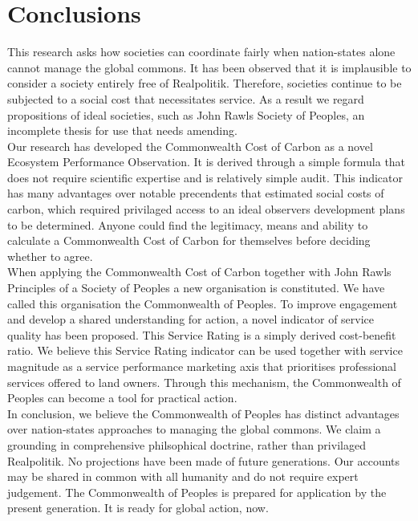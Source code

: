 \documentclass[11pt, oneside]{article}   	%
\begin{document}
\section{Conclusions}

This research asks how societies can coordinate fairly when nation-states alone cannot manage the global commons.
It has been observed that it is implausible to consider a society entirely free of Realpolitik.
Therefore, societies continue to be subjected to a social cost that necessitates service.
As a result we regard propositions of ideal societies, such as John Rawls Society of Peoples, an incomplete thesis for use that needs amending.\\

Our research has developed the Commonwealth Cost of Carbon as a novel Ecosystem Performance Observation.
It is derived through a simple formula that does not require scientific expertise and is relatively simple audit.
This indicator has many advantages over notable precendents that estimated social costs of carbon, which required privilaged access to an ideal observers development plans to be determined.
Anyone could find the legitimacy, means and ability to calculate a Commonwealth Cost of Carbon for themselves before deciding whether to agree.\\

When applying the Commonwealth Cost of Carbon together with John Rawls Principles of a Society of Peoples a new organisation is constituted.
We have called this organisation the Commonwealth of Peoples.
To improve engagement and develop a shared understanding for action, a novel indicator of service quality has been proposed.
This Service Rating is a simply derived cost-benefit ratio.
We believe this Service Rating indicator can be used together with service magnitude as a service performance marketing axis that prioritises professional services offered to land owners.
Through this mechanism, the Commonwealth of Peoples can become a tool for practical action.\\

In conclusion, we believe the Commonwealth of Peoples has distinct advantages over nation-states approaches to managing the global commons.
We claim a grounding in comprehensive philsophical doctrine, rather than privilaged Realpolitik.
No projections have been made of future generations.
Our accounts may be shared in common with all humanity and do not require expert judgement.
The Commonwealth of Peoples is prepared for application by the present generation.
It is ready for global action, now.\\
\end{document}
